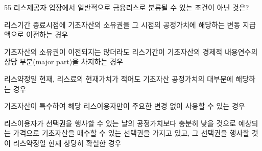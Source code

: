 \begin{question}{55}
리스제공자 입장에서 일반적으로 금융리스로 분류될 수 있는 조건이 아닌 것은?
\begin{choices}
  \item 리스기간 종료시점에 기초자산의 소유권을 그 시점의 공정가치에 해당하는 변동 지급액으로 이전하는 경우
  \item 기초자산의 소유권이 이전되지는 않더라도 리스기간이 기초자산의 경제적 내용연수의 상당 부분(major part)을 차지하는 경우
  \item 리스약정일 현재, 리스료의 현재가치가 적어도 기초자산 공정가치의 대부분에 해당하는 경우
  \item 기초자산이 특수하여 해당 리스이용자만이 주요한 변경 없이 사용할 수 있는 경우
  \item 리스이용자가 선택권을 행사할 수 있는 날의 공정가치보다 충분히 낮을 것으로 예상되는 가격으로 기초자산을 매수할 수 있는 선택권을 가지고 있고, 그 선택권을 행사할 것이 리스약정일 현재 상당히 확실한 경우
\end{choices}
\end{question}

